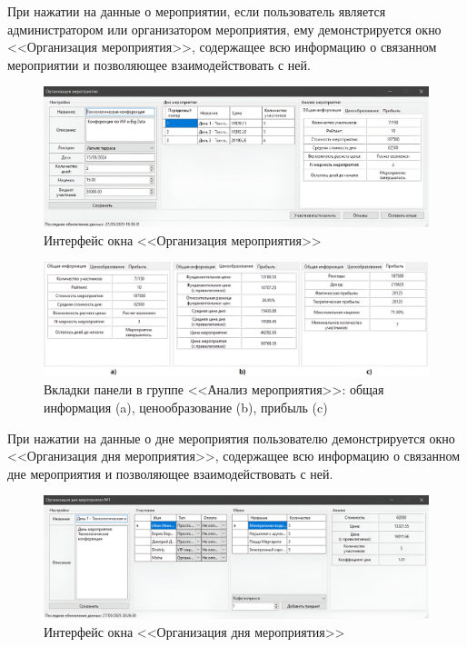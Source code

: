 \newpage

При нажатии на данные о мероприятии, если пользователь является администратором или организатором мероприятия, ему демонстрируется окно <<Организация мероприятия>>, содержащее всю информацию о связанном мероприятии и позволяющее взаимодействовать с ней.
\begin{figure}[h!]
	\centering
	\includegraphics[width=1\textwidth]{images/app-event-organization.png}
	\caption{Интерфейс окна <<Организация мероприятия>>} 
	\label{fig:app-event-organization} 
\end{figure}
\begin{figure}[h!]
	\centering
	\includegraphics[width=1\textwidth]{images/app-event-analyze.png}
	\caption{Вкладки панели в группе <<Анализ мероприятия>>: общая информация (a), ценообразование (b), прибыль (c)} 
	\label{fig:app-event-analyze} 
\end{figure}

\newpage

При нажатии на данные о дне мероприятия пользователю демонстрируется окно <<Организация дня мероприятия>>, содержащее всю информацию о связанном дне мероприятия и позволяющее взаимодействовать с ней.

\begin{figure}[h!]
	\centering
	\includegraphics[width=1\textwidth]{images/app-day-organization.png}
	\caption{Интерфейс окна <<Организация дня мероприятия>>} 
	\label{fig:app-day-organization} 
\end{figure}

